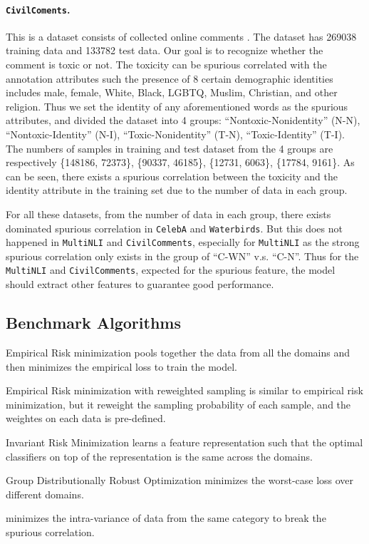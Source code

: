 \paragraph{\texttt{CivilComents}.} This is a dataset consists of collected online comments \citep{borkan2019nuanced}. The dataset has 269038 training data and 133782 test data. Our goal is to recognize whether the comment is toxic or not. The toxicity can be spurious correlated with the annotation attributes such the presence of 8 certain demographic identities includes male, female, White, Black, LGBTQ, Muslim, Christian, and other religion. Thus we set the identity of any aforementioned words as the spurious attributes, and divided the dataset into 4 groups: ``Nontoxic-Nonidentity'' (N-N), ``Nontoxic-Identity'' (N-I), ``Toxic-Nonidentity'' (T-N), ``Toxic-Identity'' (T-I). The numbers of samples in training and test dataset from the 4 groups are respectively \{148186, 72373\}, \{90337, 46185\}, \{12731, 6063\}, \{17784, 9161\}. As can be seen, there exists a spurious correlation between the toxicity and the identity attribute in the training set due to the number of data in each group. 
\par
For all these datasets, from the number of data in each group, there exists dominated spurious correlation in \texttt{CelebA} and \texttt{Waterbirds}. But this does not happened in \texttt{MultiNLI} and \texttt{CivilComments}, especially for \texttt{MultiNLI} as the strong spurious correlation only exists in the group of ``C-WN'' v.s. ``C-N''. Thus for the \texttt{MultiNLI} and \texttt{CivilComments}, expected for the spurious feature, the model should extract other features to guarantee good performance.    
\subsection{Benchmark Algorithms}\label{app:benchmark algorithms}
Empirical Risk minimization \citep[ERM,][]{vapnik1999nature} pools together the data from all the domains and then minimizes the empirical loss to train the model. 
\par
Empirical Risk minimization with reweighted sampling \citep[ERMRS,][]{idrissi2021simple} is similar to empirical risk minimization, but it reweight the sampling probability of each sample, and the weightes on each data is pre-defined. 
\par
Invariant Risk Minimization \citep[IRM,][]{arjovsky2019invariant} learns a feature representation such that the optimal classifiers on top of the representation is the same across the domains.
\par
Group Distributionally Robust Optimization \citep[GroupDRO,][]{sagawa2019distributionally} minimizes the worst-case loss over different domains.
\par
\citep[Correlation,][]{arpit2019predicting} minimizes the intra-variance of data from the same category to break the spurious correlation. 

